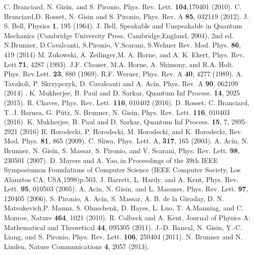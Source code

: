 \documentclass[pra,10pt,twocolumn,superscriptaddress,floatfix,showpacs]{revtex4-1}
\begin{document}
\begin{thebibliography}{1}
 C. Branciard, N. Gisin, and S. Pironio, Phys. Rev. Lett. \textbf{104},170401 (2010).
 C. Branciard,D. Rosset, N. Gisin and S. Pironio, Phys. Rev. A \textbf{85}, 032119 (2012).
 J. S. Bell, Physics \textbf{1}, 195 (1964).
 J. Bell, Speakable and Unspeakable in Quantum Mechanics (Cambridge University Press, Cambridge,England, 2004), 2nd ed.
 N.Brunner, D.Cavalcanti, S.Pironio, V.Scarani, S.Wehner Rev. Mod. Phys. \textbf{86}, 419 (2014)
 M. Zukowski, A. Zeilinger,M. A. Horne, and A. K. Ekert, Phys.
Rev. Lett.\textbf{71}, 4287 (1993).
 J.F. Clauser, M.A. Horne, A. Shimony, and R.A. Holt. Phys. Rev.Lett. \textbf{23}, 880 (1969).
 R.F. Werner, Phys. Rev. A \textbf{40}, 4277 (1989).
 A. Tavakoli, P. Skrzypczyk, D. Cavalcanti and A. Ac\'{i}n, Phys. Rev. A \textbf{90}, 062109 (2014) .
 K. Mukherjee, B. Paul and D. Sarkar, Quantum Inf Process. \textbf{14}, 2025 (2015).
 R. Chaves, Phys. Rev. Lett. \textbf{116}, 010402 (2016).
 D. Rosset, C. Branciard, T. J. Barnea, G. Pütz, N. Brunner, N. Gisin, Phys. Rev. Lett. \textbf{116}, 010403 (2016).
   K. Mukherjee, B. Paul and D. Sarkar, Quantum Inf Process. \textbf{15}, 7,
2895–2921 (2016)
 R. Horodecki, P. Horodecki, M. Horodecki, and K. Horodecki, Rev. Mod. Phys. \textbf{ 81}, 865 (2009).
 C. Sliwa, Phys. Lett. A, \textbf {317}, 165 (2003).
A. Ac\'{i}n, N. Brunner, N. Gisin, S. Massar, S. Pironio, and V. Scarani, Phys. Rev. Lett. \textbf{98}, 230501 (2007).
 D. Mayers and A. Yao,\,in Proceedings of the 39th IEEE Symposiumon Foundations of Computer Science (IEEE Computer Society, Los Alamitos  CA, USA,1998)p.503.
 J. Barrett, L. Hardy, and A. Kent, Phys. Rev. Lett. \textbf{ 95}, 010503 (2005).
 A. Ac\'{i}n, N. Gisin, and L. Masanes, Phys. Rev. Lett. \textbf{97}, 120405 (2006).
 S. Pironio, A. Ac\'{i}n, S. Massar, A. B. de la Giroday, D. N. Matsukevich,P. Maunz, S. Olmschenk, D. Hayes, L. Luo, T. A.Manning, and C. Monroe, Nature \textbf{464}, 1021 (2010).
 R. Colbeck and A. Kent, Journal of Physics A: Mathematical and Theoretical \textbf{44}, 095305 (2011).
 J.-D. Bancal, N. Gisin, Y.-C. Liang, and S. Pironio, Phys. Rev. Lett. \textbf{106}, 250404 (2011).
     N. Brunner and N. Linden, Nature Communications \textbf{ 4}, 2057 (2013).

\end{thebibliography}
\end{document}
